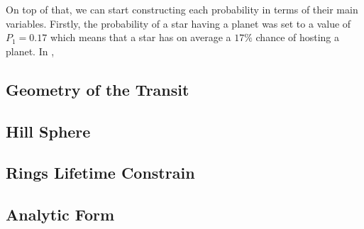 On top of that, we can start constructing each probability in terms of their main variables. Firstly, the probability of a star having a planet was set to a value of $P_1 = 0.17$ which means that a star has on average a $17\%$ chance of hosting a planet. In \citeyear{2012Natur.481..167C},  


\subsection{Geometry of the Transit}
\subsection{Hill Sphere}
\subsection{Rings Lifetime Constrain}\label{subsec:RingsSec}



\subsection{Analytic Form}


